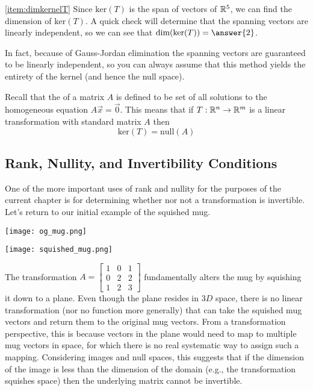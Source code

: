 \documentclass{ximera}
\begin{document}
\begin{example}
\begin{explanation}
\ref{item:dimkernelT}  Since $\mbox{ker}(T)$ is the span of  vectors of $\mathbb{R}^5$, we can find the dimension of $\mbox{ker}(T)$. A quick check will determine that the  spanning vectors are linearly independent, so we can see that $\mbox{dim}(\mbox{ker}(T))=\answer{2}$.

In fact, because of Gauss-Jordan elimination the spanning vectors are guaranteed to be linearly independent, so you can always assume that this method yields the entirety of the kernel (and hence the null space).
\end{explanation}
\end{example}
 
 
Recall that the  of a matrix $A$ is defined to be set of all solutions to the homogeneous equation $A\vec{x}=\vec{0}$. This means that  if $T:\mathbb{R}^n\rightarrow \mathbb{R}^m$ is a linear transformation with standard matrix $A$ then
$$\mbox{ker}(T)=\mbox{null}(A)$$

\subsection*{Rank, Nullity, and Invertibility Conditions}

One of the more important uses of rank and nullity for the purposes of the current chapter is for determining whether nor not a transformation is invertible. Let's return to our initial example of the squished mug.

\begin{center}
  \texttt{[image: og\_mug.png]}
\end{center}

\begin{center}
  \texttt{[image: squished\_mug.png]}
\end{center}

The transformation $A=\begin{bmatrix}
  1&0&1\\0&2&2\\1&2&3
\end{bmatrix}$ fundamentally alters the mug by squishing it down to a plane. Even though the plane resides in $3D$ space, there is no linear transformation (nor no function more generally) that can take the squished mug vectors and return them to the original mug vectors. From a transformation perspective, this is because vectors in the plane would need to map to multiple mug vectors in space, for which there is no real systematic way to assign such a mapping. Considering images and null spaces, this suggests that if the dimension of the image is less than the dimension of the domain (e.g., the transformation squishes space) then the underlying matrix cannot be invertible. 
\end{document}
